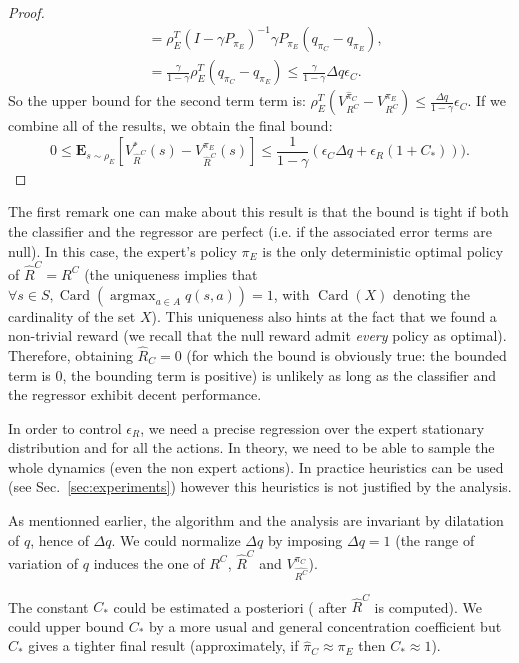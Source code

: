 \documentclass[smallextended]{svjour3}
\newcommand{\E}{\mathbf{E}}
\newcommand{\argmax}{\operatorname*{argmax}} %
\newcommand{\Card}{\operatorname*{Card}} %
\begin{document}
\begin{proof}
\begin{align}
&=\rho_E^T(I-\gamma P_{\pi_E})^{-1}\gamma P_{\pi_E}(q_{\pi_C}-q_{\pi_E}),
\\
&=\frac{\gamma}{1-\gamma}\rho_E^T(q_{\pi_C}-q_{\pi_E})\leq \frac{\gamma}{1-\gamma}\Delta q \epsilon_C.
\end{align}
So the upper bound for the second term term is: $\rho_E^T(V^{\hat{\pi}_C}_{R^C}-V^{\pi_E}_{R^C})\leq \frac{\Delta q}{1-\gamma}\epsilon_C$.
If we combine all of the results, we obtain the final bound:
\begin{equation}
0\leq\E_{s\sim\rho_E}[V^*_{\hat{R}^C}(s)-V^{\pi_E}_{\hat{R}^C}(s)]\leq \frac{1}{1-\gamma}(\epsilon_C\Delta q +\epsilon_R(1+C_*))).
\end{equation}
\end{proof}

The first remark one can make about this result is that the bound is tight if both the classifier and the regressor are perfect (i.e. if the associated error terms are null). In this case, the expert's policy  $\pi_E$ is the only deterministic optimal policy of $\hat{R}^C=R^C$ (the uniqueness implies that $\forall s\in S, \Card(\argmax_{a\in A}q(s,a))=1$, with $\Card(X)$ denoting the cardinality of the set $X$). This uniqueness also hints at the fact that we found a non-trivial reward (we recall that the null reward admit \emph{every} policy as optimal). Therefore, obtaining  $\hat{R}_C = 0$ (for which the bound is obviously true: the bounded term is $0$, the bounding term is positive) is unlikely as long as the classifier and the regressor exhibit decent performance.


In order to control $\epsilon_R$, we need a precise regression over the expert stationary distribution and for all the actions. In theory, we need to be able to sample the whole dynamics (even the non expert actions). In practice heuristics can be used (see Sec.~\ref{sec:experiments}) however this heuristics is not justified by the analysis.

As mentionned earlier, the algorithm and the analysis are invariant by  dilatation of $q$, hence of $\Delta q$. We could normalize $\Delta q$ by imposing $\Delta q=1$ (the range of variation of $q$ induces the one of $R^C$, $\hat{R}^C$ and $V^{\pi_C}_{\hat{R^C}}$).

The constant $C_*$ could be estimated a posteriori ( after $\hat{R}^C$ is computed). We could upper bound $C_*$ by a more usual and general concentration coefficient but $C_*$ gives a tighter final result (approximately, if $\hat{\pi}_C\approx\pi_E$ then $C_* \approx 1$).
\end{document}
